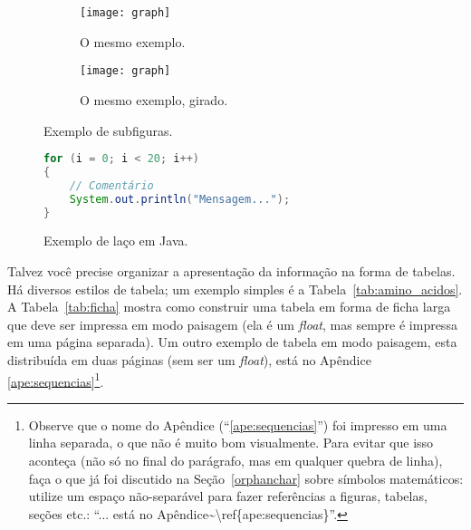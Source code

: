 \begin{figure}
  \centering
  \begin{subfigure}{0.4\textwidth}
    \texttt{[image: graph]}
    \caption{O mesmo exemplo.}
    \label{fig:subfigures:a}
  \end{subfigure}
  \begin{subfigure}{0.4\textwidth}
    \begin{turn}{90}
      \texttt{[image: graph]}
    \end{turn}
    \caption{O mesmo exemplo, girado.}
    \label{fig:subfigures:b}
  \end{subfigure}
  \caption{Exemplo de subfiguras.}
  \label{fig:subfigures}
\end{figure}


\begin{figure}
  \centering
\begin{lstlisting}[language=Java, style=wider]
for (i = 0; i < 20; i++)
{
	// Comentário
	System.out.println("Mensagem...");
}
\end{lstlisting}
  \caption{Exemplo de laço em Java.}
  \label{fig:java}
\end{figure}

Talvez você precise organizar a apresentação da informação na forma de
tabelas. Há diversos estilos de tabela; um exemplo simples é a
Tabela~\ref{tab:amino_acidos}. A Tabela~\ref{tab:ficha} mostra como construir
uma tabela em forma de ficha larga que deve ser impressa em modo paisagem (ela
é um \textit{float}, mas sempre é impressa em uma página separada). Um outro
exemplo de tabela em modo paisagem, esta distribuída em duas páginas (sem ser
um \textit{float}), está no Apêndice \ref{ape:sequencias}\footnote{
Observe que o nome do Apêndice (``\ref{ape:sequencias}'') foi impresso em uma
linha separada, o que não é muito bom visualmente. Para evitar que isso
aconteça (não só no final do parágrafo, mas em qualquer quebra de linha),
faça o que já foi discutido na Seção~\ref{orphanchar} sobre símbolos
matemáticos: utilize um espaço não-separável para fazer referências a
figuras, tabelas, seções etc.: ``\textsf{... está no
Apêndice\textasciitilde\textbackslash{}ref\{ape:sequencias\}}''.}.


